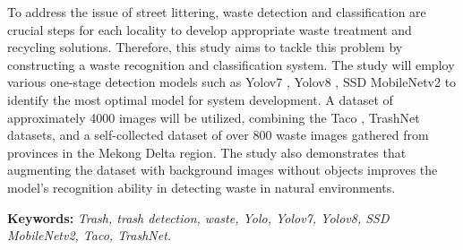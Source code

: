 \documentclass[./thesis.tex]{subfiles}
\begin{document}

{\fontsize{13}{12} \selectfont
To address the issue of street littering, waste detection and classification are crucial steps for each locality to develop appropriate waste treatment and recycling solutions.
Therefore, this study aims to tackle this problem by constructing a waste recognition and classification system. The study will employ various one-stage detection models such as Yolov7 \cite{wang2022yolov7}, Yolov8 \cite{Yolov8}, SSD MobileNetv2 \cite{Liu_2016} \cite{sandler2019mobilenetv2} to identify the most optimal model for system development.
A dataset of approximately 4000 images will be utilized, combining the Taco \cite{proença2020taco}, TrashNet \cite{yang2016classification} datasets, and a self-collected dataset of over 800 waste images gathered from provinces in the Mekong Delta region.
The study also demonstrates that augmenting the dataset with background images without objects improves the model's recognition ability in detecting waste in natural environments.
}
\bigskip

{\bf Keywords:} \textit{Trash, trash detection, waste, Yolo, Yolov7, Yolov8, SSD MobileNetv2, Taco, TrashNet.}
\end{document}
